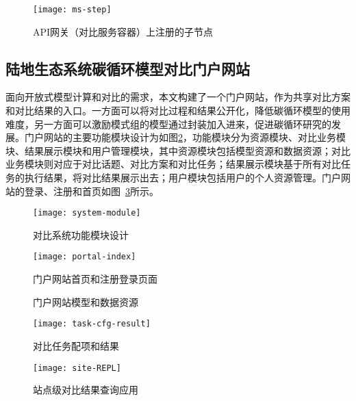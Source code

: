 \begin{figure}[!htbp]
    \centering
    \texttt{[image: ms-step]}
    \caption{API网关（对比服务容器）上注册的子节点}
    \label{fig:api-gateway-children}
\end{figure}

\subsection{陆地生态系统碳循环模型对比门户网站}
面向开放式模型计算和对比的需求，本文构建了一个门户网站，作为共享对比方案和对比结果的入口。一方面可以将对比过程和结果公开化，降低碳循环模型的使用难度，另一方面可以激励模式组的模型通过封装加入进来，促进碳循环研究的发展。门户网站的主要功能模块设计为如图\ref{fig:system-module}，功能模块分为资源模块、对比业务模块、结果展示模块和用户管理模块，其中资源模块包括模型资源和数据资源；对比业务模块则对应于对比话题、对比方案和对比任务；结果展示模块基于所有对比任务的执行结果，将对比结果展示出去；用户模块包括用户的个人资源管理。门户网站的登录、注册和首页如图~\ref{fig:portal-index}所示。

\begin{figure}[!htbp]
    \centering
    \texttt{[image: system-module]}
    \caption{对比系统功能模块设计}
    \label{fig:system-module}
\end{figure}

\begin{figure}[!htbp]
    \centering
    \texttt{[image: portal-index]}
    \caption{门户网站首页和注册登录页面}
    \label{fig:portal-index}
\end{figure}

\begin{figure}[!htbp]
    \centering
    \hfill
    \caption{门户网站模型和数据资源}
    \label{fig:portal-resource}
\end{figure}

\begin{figure}[!htbp]
    \centering
    \texttt{[image: task-cfg-result]}
    \caption{对比任务配项和结果}
    \label{fig:task-cfg-result}
\end{figure}

\begin{figure}[!htbp]
    \centering
    \texttt{[image: site-REPL]}
    \caption{站点级对比结果查询应用}
    \label{fig:site-REPL}
\end{figure}

